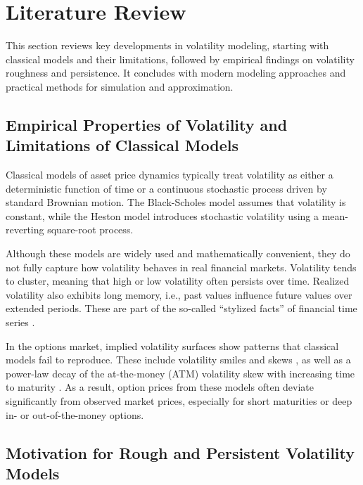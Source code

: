 \section{Literature Review} \label{sec:LiteratureReview}

This section reviews key developments in volatility modeling, starting with classical models and their limitations, followed by empirical findings on volatility roughness and persistence. It concludes with modern modeling approaches and practical methods for simulation and approximation.


\subsection{Empirical Properties of Volatility and Limitations of Classical Models} \label{subsec:EmpiricalVolatility}

Classical models of asset price dynamics typically treat volatility as either a deterministic function of time or a continuous stochastic process driven by standard Brownian motion. The Black-Scholes model \citep{BlackScholes1973} assumes that volatility is constant, while the Heston model \citep{Heston1993} introduces stochastic volatility using a mean-reverting square-root process.

Although these models are widely used and mathematically convenient, they do not fully capture how volatility behaves in real financial markets. Volatility tends to cluster, meaning that high or low volatility often persists over time. Realized volatility also exhibits long memory, i.e., past values influence future values over extended periods. These are part of the so-called “stylized facts” of financial time series \citep{Cont2001}.

In the options market, implied volatility surfaces show patterns that classical models fail to reproduce. These include volatility smiles and skews \citep{Rubinstein1985}, as well as a power-law decay of the at-the-money (ATM) volatility skew with increasing time to maturity \citep{GatheralJaissonRosenbaum2018}. As a result, option prices from these models often deviate significantly from observed market prices, especially for short maturities or deep in- or out-of-the-money options.


\subsection{Motivation for Rough and Persistent Volatility Models} \label{subsec:MotivationRoughPersistent}

